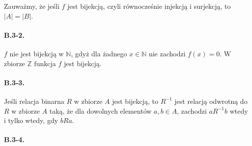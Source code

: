 \noindent Zauważmy, że jeśli $f$ jest bijekcją, czyli równocześnie injekcją i surjekcją, to $|A|=|B|$.

\paragraph{B.3-2.}
$f$ nie jest bijekcją w $\mathbb{N}$, gdyż dla żadnego $x\in\mathbb{N}$ nie zachodzi $f(x)=0$. W zbiorze $\mathbb{Z}$ funkcja $f$ jest bijekcją.

\paragraph{B.3-3.}
Jeśli relacja binarna $R$ w zbiorze $A$ jest bijekcją, to $R^{-1}$ jest relacją odwrotną do $R$ w zbiorze $A$ taką, że dla dowolnych elementów $a,b\in A$, zachodzi $aR^{-1}b$ wtedy i tylko wtedy, gdy $bRa$.

\paragraph{B.3-4.}



